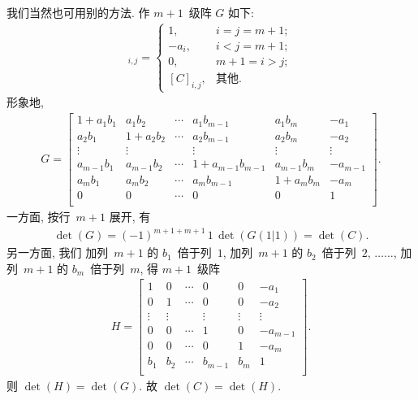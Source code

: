 \begin{example}
    我们当然也可用别的方法.
    作 \(m+1\)~级阵 \(G\) 如下:
    \begin{align*}
        [G]_{i,j} =
        \begin{cases}
            1,         & i = j = m+1; \\
            -a_i,      & i < j = m+1; \\
            0,         & m+1 = i > j; \\
            [C]_{i,j}, & \text{其他}.
        \end{cases}
    \end{align*}
    形象地,
    \begin{align*}
        G =
        \begin{bmatrix}
            1 + a_1 b_1 & a_1 b_2     & \cdots & a_1 b_{m-1}         & a_1 b_m     & -a_1     \\
            a_2 b_1     & 1 + a_2 b_2 & \cdots & a_2 b_{m-1}         & a_2 b_m     & -a_2     \\
            \vdots      & \vdots      & {}     & \vdots              & \vdots      & \vdots   \\
            a_{m-1} b_1 & a_{m-1} b_2 & \cdots & 1 + a_{m-1} b_{m-1} & a_{m-1} b_m & -a_{m-1} \\
            a_m b_1     & a_m b_2     & \cdots & a_m b_{m-1}         & 1 + a_m b_m & -a_m     \\
            0           & 0           & \cdots & 0                   & 0           & 1        \\
        \end{bmatrix}.
    \end{align*}
    一方面, 按行~\(m+1\) 展开, 有
    \begin{align*}
        \det {(G)}
        = (-1)^{m+1+m+1}\,1\,\det {(G(1|1))}
        = \det {(C)}.
    \end{align*}
    另一方面, 我们%
    加列~\(m+1\) 的 \(b_1\)~倍于列~\(1\),
    加列~\(m+1\) 的 \(b_2\)~倍于列~\(2\),
    \(\dots \dots\),
    加列~\(m+1\) 的 \(b_m\)~倍于列~\(m\),
    得 \(m+1\)~级阵
    \begin{align*}
        H =
        \begin{bmatrix}
            1      & 0      & \cdots & 0       & 0      & -a_1     \\
            0      & 1      & \cdots & 0       & 0      & -a_2     \\
            \vdots & \vdots & {}     & \vdots  & \vdots & \vdots   \\
            0      & 0      & \cdots & 1       & 0      & -a_{m-1} \\
            0      & 0      & \cdots & 0       & 1      & -a_m     \\
            b_1    & b_2    & \cdots & b_{m-1} & b_m    & 1        \\
        \end{bmatrix}.
    \end{align*}
    则 \(\det {(H)} = \det {(G)}\).
    故 \(\det {(C)} = \det {(H)}\).


\end{example}
